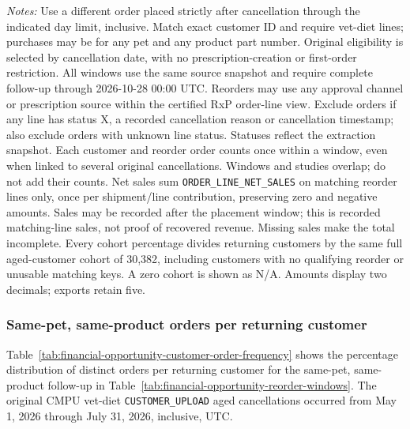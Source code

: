 \begin{table}[!htbp]
\begin{minipage}{\linewidth}
\footnotesize
\textit{Notes:} Use a different order placed strictly after cancellation through the indicated day limit, inclusive. Match exact customer ID and require vet-diet lines; purchases may be for any pet and any product part number. Original eligibility is selected by
cancellation date, with no prescription-creation or first-order restriction.
All windows use the same source snapshot and require complete follow-up through
2026-10-28 00:00 UTC. Reorders may use any approval channel or prescription
source within the certified RxP order-line view. Exclude orders if any line has
status X, a recorded cancellation reason or cancellation timestamp; also exclude
orders with unknown line status. Statuses reflect the extraction snapshot.
Each customer and reorder order counts once within a window, even when linked
to several original cancellations. Windows and studies overlap; do not add their counts.
Net sales sum \texttt{ORDER\_LINE\_NET\_SALES} on matching reorder lines only,
once per shipment/line contribution, preserving zero and negative amounts.
Sales may be recorded after the placement window; this is recorded matching-line
sales, not proof of recovered revenue. Missing sales make the total incomplete.
Every cohort percentage divides returning customers by the same full aged-customer cohort of 30,382, including customers with no qualifying reorder or unusable matching keys. A zero cohort is shown as N/A. Amounts display two decimals; exports retain five.
\end{minipage}
\end{table}

\clearpage
\subsubsection{Same-pet, same-product orders per returning customer}
Table~\ref{tab:financial-opportunity-customer-order-frequency} shows the
percentage distribution of distinct orders per returning customer for the
same-pet, same-product follow-up in Table~\ref{tab:financial-opportunity-reorder-windows}.
The original CMPU vet-diet \texttt{CUSTOMER\_UPLOAD} aged cancellations occurred
from May 1, 2026 through July 31, 2026, inclusive, UTC.

